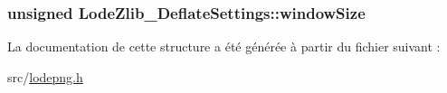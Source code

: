 \subsubsection[{window\+Size}]{\setlength{\rightskip}{0pt plus 5cm}unsigned Lode\+Zlib\+\_\+\+Deflate\+Settings\+::window\+Size}\label{struct_lode_zlib___deflate_settings_ab4db0ff77376a9a8b9af7f85cafc6028}


La documentation de cette structure a été générée à partir du fichier suivant \+:\begin{DoxyCompactItemize}
\item 
src/\hyperlink{lodepng_8h}{lodepng.\+h}\end{DoxyCompactItemize}
